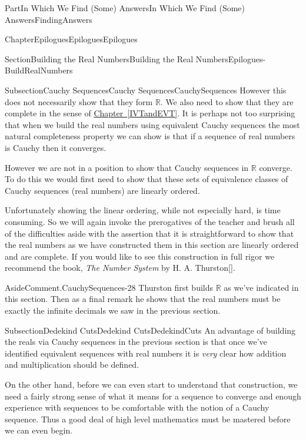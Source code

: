 \documentclass[oneside,10pt,]{book}
\newcommand{\xreffont}{\relax}
\numberwithin{equation}{part}
\newcommand{\RR}{\mathbb {R}}
\begin{document}
\begin{partptx}{Part}{In Which We Find (Some) Answers}{}{In Which We Find (Some) Answers}{}{}{FindingAnswers}
\begin{chapterptx}{Chapter}{Epilogues}{}{Epilogues}{}{}{Epilogues}
\begin{sectionptx}{Section}{Building the Real Numbers}{}{Building the Real Numbers}{}{}{Epilogues-BuildRealNumbers}
\begin{subsectionptx}{Subsection}{Cauchy Sequences}{}{Cauchy Sequences}{}{}{CauchySequences}
However this does not necessarily show that they form \(\RR\).  We also need to show that they are complete in the sense of \hyperref[IVTandEVT]{Chapter~{\xreffont\ref{IVTandEVT}}}.  It is perhaps not too surprising that when we build the real numbers using equivalent Cauchy sequences the most natural completeness property we can show is that if a sequence of real numbers is Cauchy then it converges.%
\par
However we are not in a position to show that Cauchy sequences in \(\RR\) converge.  To do this we would first need to show that these sets of equivalence classes of Cauchy sequences (real numbers) are linearly ordered.%
\par
Unfortunately showing the linear ordering, while not especially hard, is time consuming.  So we will again invoke the prerogatives of the teacher and brush all of the difficulties aside with the assertion that it is straightforward to show that the real numbers as we have constructed them in this section are linearly ordered and are complete.  If you would like to see this construction in full rigor we recommend the book, \emph{The Number System} by H. A. Thurston\hyperlink{thurston56__number_system}{[{\xreffont 16}]}.%
\begin{aside}{Aside}{Comment.}{CauchySequences-28}%
Thurston first builds \(\RR\) as we've indicated in this section.  Then as a final remark he shows that the real numbers must be exactly the infinite decimals we saw in the previous section.%
\end{aside}
\end{subsectionptx}
%
%
\typeout{************************************************}
\typeout{************************************************}
%
\begin{subsectionptx}{Subsection}{Dedekind Cuts}{}{Dedekind Cuts}{}{}{DedekindCuts}
An advantage of building the reals via Cauchy sequences in the previous section is that once we've identified equivalent sequences with real numbers it is \emph{very} clear how addition and multiplication should be defined.%
\par
On the other hand, before we can even start to understand that construction, we need a fairly strong sense of what it means for a sequence to converge and enough experience with sequences to be comfortable with the notion of a Cauchy sequence.  Thus a good deal of high level mathematics must be mastered before we can even begin.%
\par

\end{subsectionptx}
\end{sectionptx}
\end{chapterptx}
\end{partptx}
\end{document}
